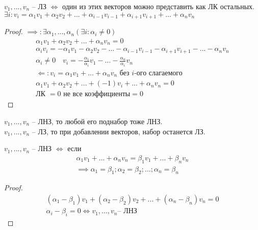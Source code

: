 \begin{theorem}
    $v_1,...,v_n$ -- ЛЗ $\Leftrightarrow$ один из этих векторов можно представить как ЛК остальных.
    $\exists i: v_i= \alpha_1 v_1 +\alpha_2 v_2 + ... + \alpha_{i-1} v_{i-1} + \alpha_{i+1} v_{i+1} + ... +\alpha_n v_n$
\end{theorem}
\begin{proof}
    $\implies : \exists \alpha_1,...,\alpha_n (\exists i: \alpha_i \neq 0)$
    \begin{gather*}
        \alpha_1 v_1 + \alpha_2 v_2 + ... + \alpha_n v_n = 0\\
        \alpha_i v_i = - \alpha_1 v_1 - \alpha_2 v_2 - ... - \alpha_{i-1} v_{i-1} - \alpha_{i+1} v_{i+1} - ... -\alpha_n v_n\\
        \alpha_i \neq 0 \quad v_i = -\frac{\alpha_1}{\alpha_i}v_1 -... - \frac{\alpha_n}{\alpha_i}v_n\\
        \Leftarrow: v_i = \alpha_1 v_1 + ... + \alpha_n v_n \text{ без } i\text{-ого слагаемого}\\
        \alpha_1 v_1 + \alpha_2 v_2 + ... + (-1)v_i + ... + \alpha_n v_n =0\\
        \text{ЛК } = 0 \text{ не все коэффициенты} = 0
    \end{gather*}
\end{proof}

\begin{prop}
    $v_1,...,v_n $ -- ЛНЗ, то любой его поднабор тоже ЛНЗ.\\
    $v_1,...,v_n $ -- ЛЗ, то при добавлении векторов, набор останется ЛЗ.
\end{prop}


\begin{theorem}
    $v_1,..., v_n$ -- ЛНЗ $\Leftrightarrow$ если
    \begin{gather*}
        \alpha_1 v_1 + ... + \alpha_n v_n = \beta_1 v_1 + ... + \beta_n v_n\\
        \implies \alpha_1 = \beta_1; \alpha_2 = \beta_2; ... ; \alpha_n = \beta_n
    \end{gather*}
\end{theorem}
\begin{proof}
    \begin{gather*}
        (\alpha_1 - \beta_1)v_1 + (\alpha_2 - \beta_2)v_2 + ...
        + (\alpha_n - \beta_n)v_n = 0\\
        \alpha_i - \beta_i = 0 \Leftrightarrow v_1, ..., v_n\text{-- ЛНЗ}
    \end{gather*}
\end{proof}
